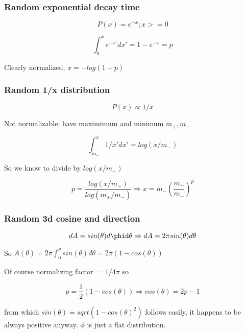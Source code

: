 

\subsubsection*{Random exponential decay time}
$$P(x)= e^{-x} ; x>=0$$

$$\int_0^x e^{-x'} dx' = 1 - e^{-x} = p $$

Clearly normalized, $x = -log(1-p)$

\subsubsection*{Random 1/x distribution}
$$P(x)\propto 1/x$$

Not normalizable; have maximimum and minimum $m_+,m_-$

$$\int_{m_-}^x1/x' dx' = log(x/m_-)$$

So we know to divide by $log(x/m_-)$

$$p = \frac{log(x/m_-)}{log(m_+/m_-)}  \Rightarrow
  x = m_-\left(\frac{m_+}{m_-}\right)^p$$

\subsubsection*{Random 3d cosine and direction}
$$dA = sin(\theta)d\phid\theta \Rightarrow dA = 2\pi sin(\theta)d\theta$$

So $A(\theta) = 2\pi \int_0^\theta sin(\theta)d\theta = 2\pi(1-cos(\theta))$

Of course normalizing factor $=1/4\pi$ so

$$ p = \frac{1}{2}(1-cos(\theta)) \Rightarrow cos(\theta) = 2p-1 $$

from which $sin(\theta)=sqrt(1-cos(\theta)^2)$ follows easily, it happens to be
always positive anyway. $\phi$ is just a flat distribution.
